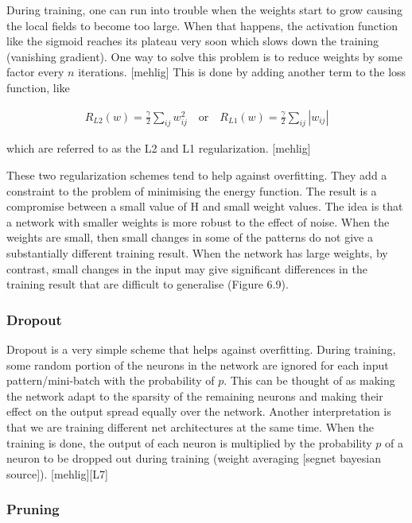 During training, one can run into trouble when the weights start to grow causing the local fields to become too large. When that happens, the activation function like the sigmoid reaches its plateau very soon which slows down the training (vanishing gradient). One way to solve this problem is to reduce weights by some factor every $ n $ iterations. [mehlig] This is done by adding another term to the loss function, like

\begin{gather}
	R_{L2}(w) = \frac{\gamma}{2} \sum\limits_{ij} w_{ij}^{2} \quad \text{or} \quad R_{L1}(w) = \frac{\gamma}{2} \sum\limits_{ij} |w_{ij}|
\end{gather}

\noindent which are referred to as the L2 and L1 regularization. [mehlig]

These two regularization schemes tend to help against overfitting. They add a constraint to the problem of minimising the energy function. The result is a compromise between a small value of H and small weight values. The idea is that a network with smaller weights is more robust to the effect of noise. When the weights are small, then small changes in some of the
patterns do not give a substantially different training result. When the network has large weights, by contrast, small changes in the input may give significant differences in the training result that are difficult to generalise (Figure 6.9).

\subsubsection{Dropout}

Dropout is a very simple scheme that helps against overfitting. During training, some random portion of the neurons in the network are ignored for each input pattern/mini-batch with the probability of $ p $. This can be thought of as making the network adapt to the sparsity of the remaining neurons and making their effect on the output spread equally over the network. Another interpretation is that we are training different net architectures at the same time. When the training is done, the output of each neuron is multiplied by the probability $ p $ of a neuron to be dropped out during training (weight averaging [segnet bayesian source]).  [mehlig][L7]

\subsubsection{Pruning}

